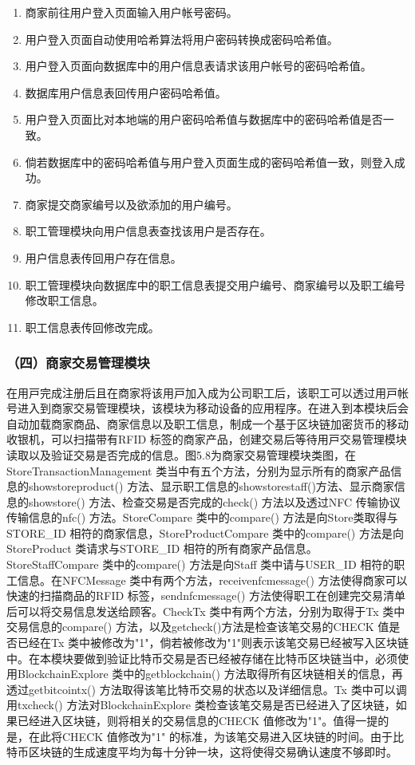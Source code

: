 	\begin{enumerate}
	\item 商家前往用户登入页面输入用户帐号密码。
	\item 用户登入页面自动使用哈希算法将用户密码转换成密码哈希值。
	\item 用户登入页面向数据库中的用户信息表请求该用户帐号的密码哈希值。
	\item 数据库用户信息表回传用户密码哈希值。
	\item 用户登入页面比对本地端的用户密码哈希值与数据库中的密码哈希值是否一致。
	\item 倘若数据库中的密码哈希值与用户登入页面生成的密码哈希值一致，则登入成功。
	\item 商家提交商家编号以及欲添加的用户编号。
	\item 职工管理模块向用户信息表查找该用户是否存在。
	\item 用户信息表传回用户存在信息。
	\item 职工管理模块向数据库中的职工信息表提交用户编号、商家编号以及职工编号修改职工信息。
	\item 职工信息表传回修改完成。
	\end{enumerate}

\subsubsection{（四）商家交易管理模块}
在⽤⼾完成注册后且在商家将该⽤⼾加⼊成为公司职⼯后，该职⼯可以透过⽤⼾帐号进⼊到商家交易管理模块，该模块为移动设备的应⽤程序。在进⼊到本模块后会⾃动加载商家商品、商家信息以及职⼯信息，制成⼀个基于区块链加密货币的移动收银机，可以扫描带有RFID 标签的商家产品，创建交易后等待⽤⼾交易管理模块读取以及验证交易是否完成的信息。图5.8为商家交易管理模块类图，在StoreTransactionManagement 类当中有五个⽅法，分别为显⽰所有的商家产品信息的showstoreproduct() ⽅法、显⽰职⼯信息的showstorestaff()⽅法、显⽰商家信息的showstore() ⽅法、检查交易是否完成的check() ⽅法以及透过NFC 传输协议传输信息的nfc() ⽅法。StoreCompare 类中的compare() ⽅法是向Store类取得与STORE\_ID 相符的商家信息，StoreProductCompare 类中的compare() ⽅法是向StoreProduct 类请求与STORE\_ID 相符的所有商家产品信息。StoreStaffCompare 类中的compare() ⽅法是向Staff 类中请与USER\_ID 相符的职⼯信息。在NFCMessage 类中有两个⽅法，receivenfcmessage() ⽅法使得商家可以快速的扫描商品的RFID 标签，sendnfcmessage() ⽅法使得职⼯在创建完交易清单后可以将交易信息发送给顾客。CheckTx 类中有两个⽅法，分别为取得于Tx 类中交易信息的compare() ⽅法，以及getcheck()⽅法是检查该笔交易的CHECK 值是否已经在Tx 类中被修改为"1"，倘若被修改为"1"则表示该笔交易已经被写⼊区块链中。在本模块要做到验证⽐特币交易是否已经被存储在⽐特币区块链当中，必须使⽤BlockchainExplore 类中的getblockchain() ⽅法取得所有区块链相关的信息，再透过getbitcointx() ⽅法取得该笔⽐特币交易的状态以及详细信息。Tx 类中可以调⽤txcheck() ⽅法对BlockchainExplore 类检查该笔交易是否已经进⼊了区块链，如果已经进⼊区块链，则将相关的交易信息的CHECK 值修改为"1"。值得⼀提的是，在此将CHECK 值修改为"1" 的标准，为该笔交易进⼊区块链的时间。由于⽐特币区块链的⽣成速度平均为每⼗分钟⼀块，这将使得交易确认速度不够即时。


